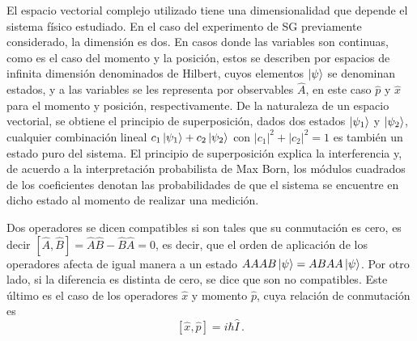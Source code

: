 
El espacio vectorial complejo utilizado tiene una dimensionalidad que depende el sistema físico estudiado. En el caso del experimento de SG previamente considerado, la dimensión es dos. En casos donde las variables son continuas, como es el caso del momento y la posición, estos se describen por espacios de infinita dimensión denominados de Hilbert, cuyos elementos $\ket{\psi}$ se denominan estados, y a las variables se les representa por observables $\hat{A}$, en este caso $\hat{p}$ y $\hat{x}$ para el momento y posición, respectivamente. De la naturaleza de un espacio vectorial, se obtiene el principio de superposición, dados dos estados $\ket{\psi_1}$ y $\ket{\psi_2}$, cualquier combinación lineal $c_1 \ket{\psi_1} + c_2 \ket{\psi_2}$ con $|c_1|^2 + |c_2|^2 = 1$ es también un estado puro del sistema. El principio de superposición explica la interferencia y, de acuerdo a la interpretación probabilista de Max Born, los módulos cuadrados de los coeficientes denotan las probabilidades de que el sistema se encuentre en dicho estado al momento de realizar una medición.

Dos operadores se dicen compatibles si son tales que su conmutación es cero, es decir $[\hat{A}, \hat{B}] = \hat{A}\hat{B} - \hat{B}\hat{A} = 0$, es decir, que el orden de aplicación de los operadores afecta de igual manera a un estado $A{A} A{B} \ket{\psi} = A{B} A{A} \ket{\psi}$. Por otro lado, si la diferencia es distinta de cero, se dice que son no compatibles. Este último es el caso de los operadores $\hat{x}$ y momento $\hat{p}$, cuya relación de conmutación es
\begin{equation}
  \label{1.3}
  [\hat{x}, \hat{p}] = i\hbar \hat{I}\,.
\end{equation}


